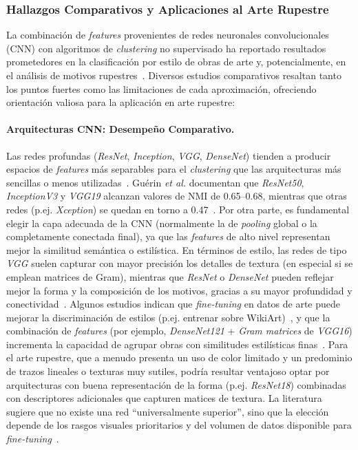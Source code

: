 \subsubsection{Hallazgos Comparativos y Aplicaciones al Arte Rupestre}

La combinación de \textit{features} provenientes de redes neuronales convolucionales (CNN) con algoritmos de \textit{clustering} no supervisado ha reportado resultados prometedores en la clasificación por estilo de obras de arte y, potencialmente, en el análisis de motivos rupestres~\cite{dangeti2024,castellano2022}.
Diversos estudios comparativos resaltan tanto los puntos fuertes como las limitaciones de cada aproximación, ofreciendo orientación valiosa para la aplicación en arte rupestre:

\paragraph{Arquitecturas CNN: Desempeño Comparativo.}
Las redes profundas (\textit{ResNet}, \textit{Inception}, \textit{VGG}, \textit{DenseNet}) tienden a producir espacios de \textit{features} más separables para el \textit{clustering} que las arquitecturas más sencillas o menos utilizadas~\cite{guerin2018}.
Guérin \textit{et al.} documentan que \textit{ResNet50}, \textit{InceptionV3} y \textit{VGG19} alcanzan valores de NMI de 0.65–0.68, mientras que otras redes (p.ej. \textit{Xception}) se quedan en torno a 0.47~\cite{guerin2018}.
Por otra parte, es fundamental elegir la capa adecuada de la CNN (normalmente la de \textit{pooling} global o la completamente conectada final), ya que las \textit{features} de alto nivel representan mejor la similitud semántica o estilística.
En términos de estilo, las redes de tipo \textit{VGG} suelen capturar con mayor precisión los detalles de textura (en especial si se emplean matrices de Gram), mientras que \textit{ResNet} o \textit{DenseNet} pueden reflejar mejor la forma y la composición de los motivos, gracias a su mayor profundidad y conectividad~\cite{gairola2020}.
Algunos estudios indican que \textit{fine-tuning} en datos de arte puede mejorar la discriminación de estilos (p.ej. entrenar sobre WikiArt)~\cite{sanakoyeu2018}, y que la combinación de \textit{features} (por ejemplo, \textit{DenseNet121} + \textit{Gram matrices} de \textit{VGG16}) incrementa la capacidad de agrupar obras con similitudes estilísticas finas~\cite{dangeti2024}.
Para el arte rupestre, que a menudo presenta un uso de color limitado y un predominio de trazos lineales o texturas muy sutiles, podría resultar ventajoso optar por arquitecturas con buena representación de la forma (p.ej. \textit{ResNet18}) combinadas con descriptores adicionales que capturen matices de textura.
La literatura sugiere que no existe una red “universalmente superior”, sino que la elección depende de los rasgos visuales prioritarios y del volumen de datos disponible para \textit{fine-tuning}~\cite{guerin2018,gairola2020}.

